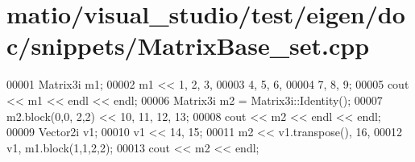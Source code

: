 \hypertarget{matio_2visual__studio_2test_2eigen_2doc_2snippets_2_matrix_base__set_8cpp_source}{}\section{matio/visual\+\_\+studio/test/eigen/doc/snippets/\+Matrix\+Base\+\_\+set.cpp}
\label{matio_2visual__studio_2test_2eigen_2doc_2snippets_2_matrix_base__set_8cpp_source}

\begin{DoxyCode}
00001 Matrix3i m1;
00002 m1 << 1, 2, 3,
00003       4, 5, 6,
00004       7, 8, 9;
00005 cout << m1 << endl << endl;
00006 Matrix3i m2 = Matrix3i::Identity();
00007 m2.block(0,0, 2,2) << 10, 11, 12, 13;
00008 cout << m2 << endl << endl;
00009 Vector2i v1;
00010 v1 << 14, 15;
00011 m2 << v1.transpose(), 16,
00012       v1, m1.block(1,1,2,2);
00013 cout << m2 << endl;
\end{DoxyCode}
